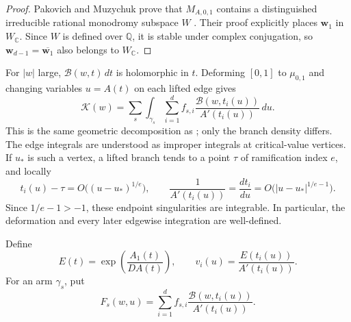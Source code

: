 \documentclass[11pt]{article}
\numberwithin{equation}{section}
\theoremstyle{definition}
\theoremstyle{remark}
\newcommand{\C}{\mathbb C}
\newcommand{\Q}{\mathbb Q}
\newcommand{\Bcal}{\mathcal B}
\newcommand{\Kcal}{\mathcal K}
\begin{document}
\begin{proof}
Pakovich and Muzychuk prove that $M_{A,0,1}$ contains a distinguished irreducible rational monodromy subspace $W$ \cite[Proposition~4.1 and its proof]{PakovichMuzychuk}.  Their proof explicitly places $\mathbf w_1$ in $W_\C$.  Since $W$ is defined over $\Q$, it is stable under complex conjugation, so $\mathbf w_{d-1}=\overline{\mathbf w_1}$ also belongs to $W_\C$.
\end{proof}

For $|w|$ large, $\Bcal(w,t)\,dt$ is holomorphic in $t$.  Deforming $[0,1]$ to $\mu_{0,1}$ and changing variables $u=A(t)$ on each lifted edge gives
\begin{equation}\label{eq:constellation-decomposition}
  \Kcal(w)=\sum_s\int_{\gamma_s}
  \sum_{i=1}^d f_{s,i}
  \frac{\Bcal(w,t_i(u))}{A'(t_i(u))}\,du.
\end{equation}
This is the same geometric decomposition as
\cite[(16)--(17)]{PakovichMuzychuk}; only the branch density differs.  The
edge integrals are understood as improper integrals at critical-value
vertices.  If $u_*$ is such a vertex, a lifted branch tends to a point
$\tau$ of ramification index $e$, and locally
\[
  t_i(u)-\tau=O\bigl((u-u_*)^{1/e}\bigr),
  \qquad
  \frac1{A'(t_i(u))}=\frac{dt_i}{du}
  =O\bigl(|u-u_*|^{1/e-1}\bigr).
\]
Since $1/e-1>-1$, these endpoint singularities are integrable.  In
particular, the deformation and every later edgewise integration are
well-defined.

Define
\begin{equation}\label{eq:E-and-v}
  E(t)=\exp\!\left(\frac{A_1(t)}{DA(t)}\right),
  \qquad
  v_i(u)=\frac{E(t_i(u))}{A'(t_i(u))}.
\end{equation}
For an arm $\gamma_s$, put
\begin{equation}\label{eq:arm-density}
  F_s(w,u)=\sum_{i=1}^d f_{s,i}
  \frac{\Bcal(w,t_i(u))}{A'(t_i(u))}.
\end{equation}
\end{document}
